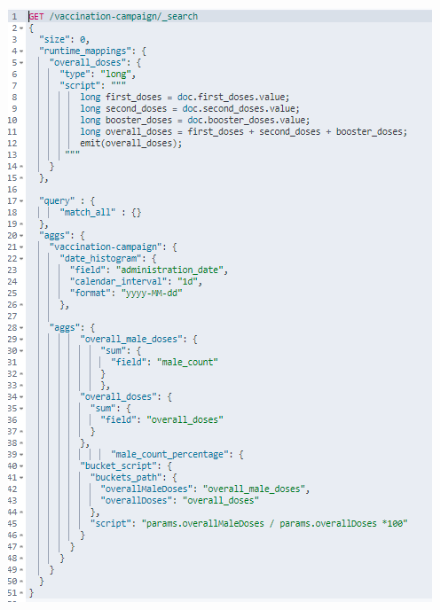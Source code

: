 \documentclass{article}[IEEEtran]
\begin{document}
\begin{figure}[H]
\begin{center}
\begin{minipage}[b]{0.4\textwidth}
    \includegraphics[width=\textwidth, frame]{Query_4.PNG}
    \subcaption{}
  \end{minipage}
  \hfill
  \begin{minipage}[b]{0.4\textwidth}

\end{minipage}
\end{center}
\end{figure}
\end{document}
